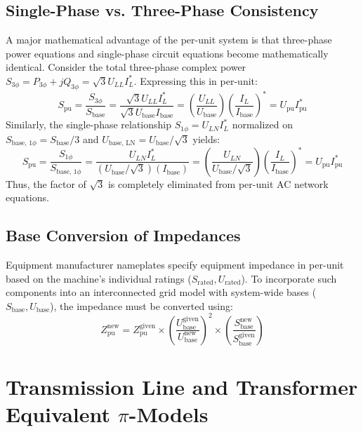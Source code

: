 \documentclass[12pt,a4paper,oneside]{report}
\begin{document}
\subsection{Single-Phase vs. Three-Phase Consistency}
A major mathematical advantage of the per-unit system is that three-phase power equations and single-phase circuit equations become mathematically identical. Consider the total three-phase complex power $S_{\text{3}\phi} = P_{\text{3}\phi} + jQ_{\text{3}\phi} = \sqrt{3} U_{LL} I_L^*$. Expressing this in per-unit:
\begin{equation}
S_{\text{pu}} = \frac{S_{\text{3}\phi}}{S_{\text{base}}} = \frac{\sqrt{3} U_{LL} I_L^*}{\sqrt{3} U_{\text{base}} I_{\text{base}}} = \left(\frac{U_{LL}}{U_{\text{base}}}\right) \left(\frac{I_L}{I_{\text{base}}}\right)^* = U_{\text{pu}} I_{\text{pu}}^*
\end{equation}
Similarly, the single-phase relationship $S_{\text{1}\phi} = U_{LN} I_L^*$ normalized on $S_{\text{base, 1}\phi} = S_{\text{base}} / 3$ and $U_{\text{base, LN}} = U_{\text{base}} / \sqrt{3}$ yields:
\begin{equation}
S_{\text{pu}} = \frac{S_{\text{1}\phi}}{S_{\text{base, 1}\phi}} = \frac{U_{LN} I_L^*}{(U_{\text{base}}/\sqrt{3})(I_{\text{base}})} = \left(\frac{U_{LN}}{U_{\text{base}}/\sqrt{3}}\right) \left(\frac{I_L}{I_{\text{base}}}\right)^* = U_{\text{pu}} I_{\text{pu}}^*
\end{equation}
Thus, the factor of $\sqrt{3}$ is completely eliminated from per-unit AC network equations.

\subsection{Base Conversion of Impedances}
Equipment manufacturer nameplates specify equipment impedance in per-unit based on the machine's individual ratings ($S_{\text{rated}}, U_{\text{rated}}$). To incorporate such components into an interconnected grid model with system-wide bases ($S_{\text{base}}, U_{\text{base}}$), the impedance must be converted using:
\begin{equation}
Z_{\text{pu}}^{\text{new}} = Z_{\text{pu}}^{\text{given}} \times \left(\frac{U_{\text{base}}^{\text{given}}}{U_{\text{base}}^{\text{new}}}\right)^2 \times \left(\frac{S_{\text{base}}^{\text{new}}}{S_{\text{base}}^{\text{given}}}\right)
\end{equation}

\section{Transmission Line and Transformer Equivalent $\pi$-Models}
\end{document}

